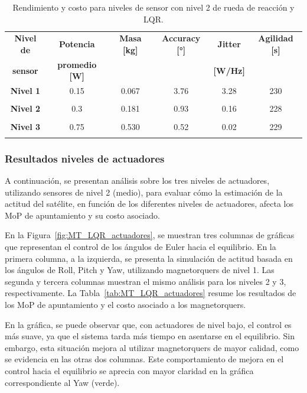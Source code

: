 \begin{table}[h!]
	\centering
	\caption{Rendimiento y costo para niveles de sensor con nivel 2 de rueda de reacción y LQR.}
	\begin{tabular}{|c|c|c|c|c|c|}
		\hline
		\textbf{Nivel de}   & \textbf{Potencia} & \textbf{Masa [kg]} & \textbf{Accuracy [°]} & \textbf{Jitter} & \textbf{Agilidad [s]}  \\ 
		\textbf{sensor}  & \textbf{promedio [W]} & & & \textbf{[W/Hz]} &  \\
		\hline
		\textbf{Nivel 1}   & 0.15  & 0.067  & 3.76 & 3.28 & 230  \\
		&  &   &  &  &    \\
		\hline
		\textbf{Nivel 2}   & 0.3  & 0.181  & 0.93 & 0.16 & 228   \\
		& & & & &   \\
		\hline
		\textbf{Nivel 3}   & 0.75  & 0.530  & 0.52 & 0.02 & 229   \\
		& & & & &   \\
		\hline		
	\end{tabular}
	\label{tab:RW_LQR_sensores}
\end{table}

\subsubsection{Resultados niveles de actuadores}

A continuación, se presentan análisis sobre los tres niveles de actuadores, utilizando sensores de nivel 2 (medio), para evaluar cómo la estimación de la actitud del satélite, en función de los diferentes niveles de actuadores, afecta los MoP de apuntamiento y su costo asociado.

En la Figura~\ref{fig:MT_LQR_actuadores}, se muestran tres columnas de gráficas que representan el control de los ángulos de Euler hacia el equilibrio. En la primera columna, a la izquierda, se presenta la simulación de actitud basada en los ángulos de Roll, Pitch y Yaw, utilizando magnetorquers de nivel 1. Las segunda y tercera columnas muestran el mismo análisis para los niveles 2 y 3, respectivamente. La Tabla~\ref{tab:MT_LQR_actuadores} resume los resultados de los MoP de apuntamiento y el costo asociado a los magnetorquers.

En la gráfica, se puede observar que, con actuadores de nivel bajo, el control es más suave, ya que el sistema tarda más tiempo en asentarse en el equilibrio. Sin embargo, esta situación mejora al utilizar magnetorquers de mayor calidad, como se evidencia en las otras dos columnas. Este comportamiento de mejora en el control hacia el equilibrio se aprecia con mayor claridad en la gráfica correspondiente al Yaw (verde).

